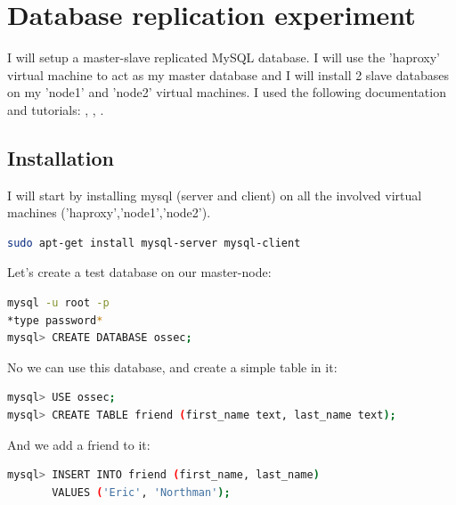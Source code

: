 \documentclass[12pt]{report}
\begin{document}
\section{Database replication experiment}
I will setup a master-slave replicated MySQL database. I will use the
'haproxy' virtual machine to act as my master database and I will
install 2 slave databases on my 'node1' and 'node2' virtual machines.
I used the following documentation and tutorials:
\cite{mysql_official_replication_doc}, \cite{mysql_replication_howtoforge}, \cite{mysql_replication_stackexchange}.

\subsection{Installation} 
I will start by installing mysql (server and client) on all the involved virtual
machines ('haproxy','node1','node2').
\begin{lstlisting}[language=bash]
sudo apt-get install mysql-server mysql-client
\end{lstlisting}

Let's create a test database on our master-node:
\begin{lstlisting}[language=bash]
mysql -u root -p
*type password*
mysql> CREATE DATABASE ossec;
\end{lstlisting}
No we can use this database, and create a simple table in it:
\begin{lstlisting}[language=bash]
mysql> USE ossec;
mysql> CREATE TABLE friend (first_name text, last_name text);
\end{lstlisting}
And we add a friend to it:
\begin{lstlisting}[language=bash]
mysql> INSERT INTO friend (first_name, last_name) 
       VALUES ('Eric', 'Northman');
\end{lstlisting}
\end{document}
